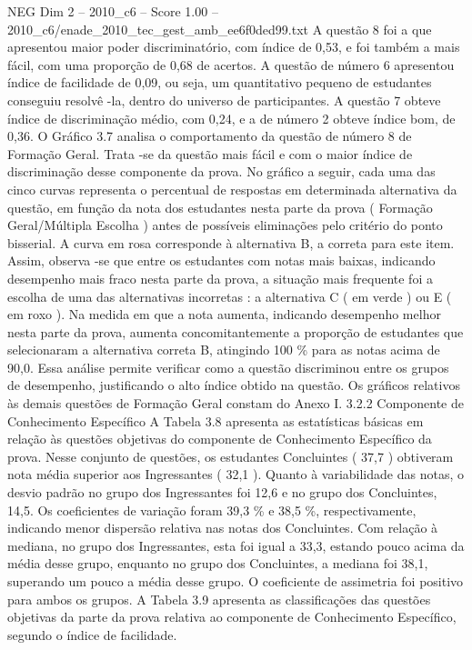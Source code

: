 \begin{textsample}{NEG Dim 2 – 2010\_c6 – Score 1.00 – 2010\_c6/enade\_2010\_tec\_gest\_amb\_ee6f0ded99.txt}
A questão 8 foi a que apresentou maior poder discriminatório, com índice de 0,53, e foi também a mais fácil, com uma proporção de 0,68 de acertos.
A questão de número 6 apresentou índice de facilidade de 0,09, ou seja, um quantitativo pequeno de estudantes conseguiu resolvê -la, dentro do universo de participantes.
A questão 7 obteve índice de discriminação médio, com 0,24, e a de número 2 obteve índice bom, de 0,36.
O Gráfico 3.7 analisa o comportamento da questão de número 8 de Formação Geral.
Trata -se da questão mais fácil e com o maior índice de discriminação desse componente da prova.
No gráfico a seguir, cada uma das cinco curvas representa o percentual de respostas em determinada alternativa da questão, em função da nota dos estudantes nesta parte da prova ( Formação Geral/Múltipla Escolha ) antes de possíveis eliminações pelo critério do ponto bisserial.
A curva em rosa corresponde à alternativa B, a correta para este item.
Assim, observa -se que entre os estudantes com notas mais baixas, indicando desempenho mais fraco nesta parte da prova, a situação mais frequente foi a escolha de uma das alternativas incorretas : a alternativa C ( em verde ) ou E ( em roxo ).
Na medida em que a nota aumenta, indicando desempenho melhor nesta parte da prova, aumenta concomitantemente a proporção de estudantes que selecionaram a alternativa correta B, atingindo 100 \% para as notas acima de 90,0.
Essa análise permite verificar como a questão discriminou entre os grupos de desempenho, justificando o alto índice obtido na questão.
Os gráficos relativos às demais questões de Formação Geral constam do Anexo I. 3.2.2 Componente de Conhecimento Específico A Tabela 3.8 apresenta as estatísticas básicas em relação às questões objetivas do componente de Conhecimento Específico da prova.
Nesse conjunto de questões, os estudantes Concluintes ( 37,7 ) obtiveram nota média superior aos Ingressantes ( 32,1 ).
Quanto à variabilidade das notas, o desvio padrão no grupo dos Ingressantes foi 12,6 e no grupo dos Concluintes, 14,5.
Os coeficientes de variação foram 39,3 \% e 38,5 \%, respectivamente, indicando menor dispersão relativa nas notas dos Concluintes.
Com relação à mediana, no grupo dos Ingressantes, esta foi igual a 33,3, estando pouco acima da média desse grupo, enquanto no grupo dos Concluintes, a mediana foi 38,1, superando um pouco a média desse grupo.
O coeficiente de assimetria foi positivo para ambos os grupos.
A Tabela 3.9 apresenta as classificações das questões objetivas da parte da prova relativa ao componente de Conhecimento Específico, segundo o índice de facilidade.

\end{textsample}

